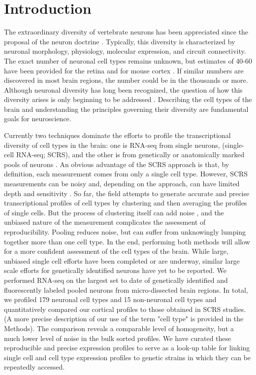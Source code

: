 \section*{Introduction}

The extraordinary diversity of vertebrate neurons has been appreciated since the proposal of the neuron doctrine \citep{Cajal_1888}. Typically, this diversity is characterized by neuronal morphology, physiology, molecular expression, and circuit connectivity. The exact number of neuronal cell types remains unknown, but estimates of 40-60 have been provided for the retina \citep{Macosko_2015,Masland_2004} and for mouse cortex \citep{Tasic_2016,Zeisel_2015}. If similar numbers are discovered in most brain regions, the number could be in the thousands or more. Although neuronal diversity has long been recognized, the question of how this diversity arises is only beginning to be addressed \citep{Arendt_2008,Muotri_2006}. Describing the cell types of the brain and understanding the principles governing their diversity are fundamental goals for neuroscience.

Currently two techniques dominate the efforts to profile the transcriptional diversity of cell types in the brain: one is RNA-seq from single neurons, (single-cell RNA-seq; SCRS), \citep[e.g.][]{Shapiro_2013} and the other is from genetically or anatomically marked pools of neurons \citep[e.g.][]{Okaty_2015,Cembrowski_2016}.  An obvious advantage of the SCRS approach is that, by definition, each measurement comes from only a single cell type. However, SCRS measurements can be noisy and, depending on the approach, can have limited depth and sensitivity \citep{Parekh_2016,Svensson_2017}. So far, the field attempts to generate accurate and precise transcriptional profiles of cell types by clustering and then averaging the profiles of single cells. But the process of clustering itself can add noise \citep{Ntranos_2016}, and the unbiased nature of the measurement complicates the assessment of reproducibility. Pooling reduces noise, but can suffer from unknowingly lumping together more than one cell type. In the end, performing both methods will allow for a more confident assessment of the cell types of the brain. While large, unbiased single cell efforts have been completed or are underway, similar large scale efforts for genetically identified neurons have yet to be reported. We performed RNA-seq on the largest set to date of genetically identified and fluorescently labeled pooled neurons from micro-dissected brain regions. In total, we profiled 179 neuronal cell types and 15 non-neuronal cell types and quantitatively compared our cortical profiles to those obtained in SCRS studies. (A more precise description of our use of the term "cell type" is provided in the Methods). The comparison reveals a comparable level of homogeneity, but a much lower level of noise in the bulk sorted profiles. We have curated these reproducible and precise expression profiles to serve as a look-up table for linking single cell and cell type expression profiles to genetic strains in which they can be repeatedly accessed. 


